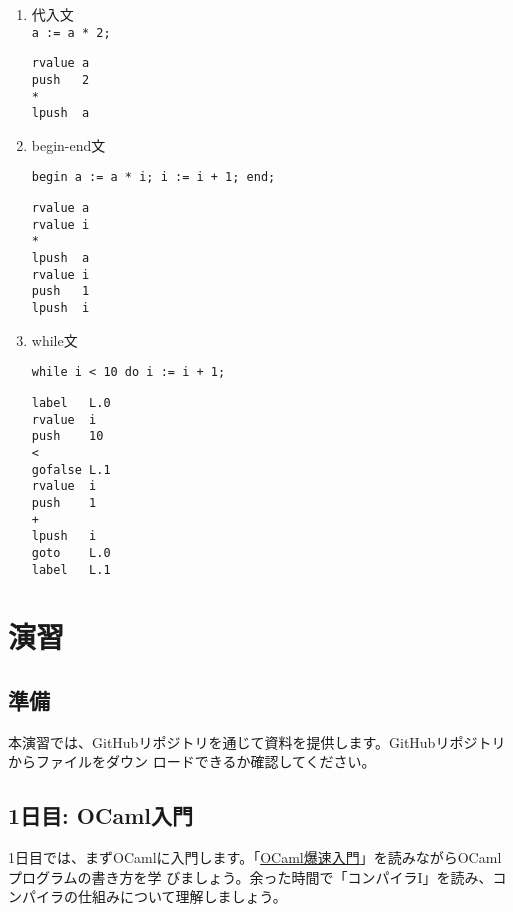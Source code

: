 \documentclass[a4paper,11pt]{jsarticle}
\begin{document}
\begin{enumerate}
\item 代入文 \\
   \texttt{a := a * 2;} \\
  \begin{lstlisting}
rvalue a
push   2
*
lpush  a
  \end{lstlisting}

\item begin-end文

   \texttt{begin a := a * i; i := i + 1; end;}

  \begin{lstlisting}
rvalue a
rvalue i
*
lpush  a
rvalue i
push   1
lpush  i
  \end{lstlisting}

\item while文

   \texttt{while i < 10 do i := i + 1;}


\begin{lstlisting}
label	L.0
rvalue	i
push	10
<
gofalse	L.1
rvalue	i
push	1
+
lpush	i
goto	L.0
label	L.1
  \end{lstlisting}

\end{enumerate}

\section{演習}

\subsection{準備}

本演習では、GitHubリポジトリを通じて資料を提供します。GitHubリポジトリからファイルをダウン
ロードできるか確認してください。

\subsection{1日目: OCaml入門}

1日目では、まずOCamlに入門します。「\href{https://www.fos.kuis.kyoto-u.ac.jp}{OCaml爆速入門}」を読みながらOCamlプログラムの書き方を学
びましょう。余った時間で「コンパイラI」を読み、コンパイラの仕組みについて理解しましょう。
\end{document}
